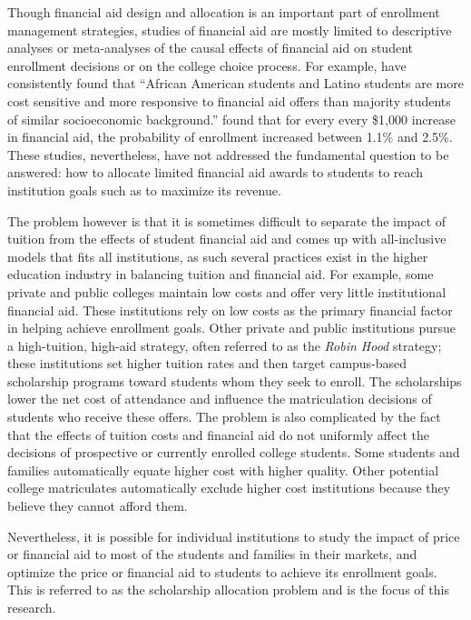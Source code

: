 \documentclass[12pt,english]{report}
\begin{document}
Though financial aid design and allocation is an important part of enrollment
management strategies, studies of financial aid are mostly limited to
descriptive analyses  or meta-analyses of the causal effects of financial aid
on student enrollment decisions or on the college choice process.   For
example, \citet{Hossler1989} have consistently found that
``African American students and Latino students are more cost sensitive and
more responsive to financial aid offers than majority students of similar
socioeconomic background.''  \citet{Braunstein1999} found that for
every every \$1,000 increase in financial aid, the probability  of  enrollment
increased between 1.1\% and 2.5\%.    These studies, nevertheless, have not
addressed the fundamental question to be answered: how to allocate limited
financial aid awards to students to reach institution goals such as to maximize
its revenue.

The problem however is that it is sometimes difficult to separate the impact of
tuition from the effects of student financial aid and comes up with
all-inclusive models that fits all institutions, as such several practices
exist in the higher education industry in balancing tuition and financial aid.
For example, some private and public colleges maintain low costs and offer very
little institutional financial aid. These institutions rely on low costs as the
primary financial factor in helping achieve enrollment goals. Other private and
public institutions pursue a high-tuition, high-aid strategy, often referred to
as the \textit{Robin Hood} strategy; these institutions set higher tuition
rates and then target campus-based scholarship programs toward students whom
they seek to enroll. The scholarships lower the net cost of attendance and
influence the matriculation decisions of students who receive these offers.
The problem is also complicated by the fact that the effects of tuition costs
and financial aid do not uniformly affect the decisions of prospective or
currently enrolled college students. Some students and families automatically
equate higher cost with higher quality. Other potential college matriculates
automatically exclude higher cost institutions because they believe they cannot
afford them.

Nevertheless, it is possible for individual institutions to study the impact of
price or financial aid to most of the students and families in their markets,
and optimize the price or financial aid to students to achieve its enrollment
goals.  This is referred to as the scholarship allocation problem and is the
focus of this research.
\end{document}
